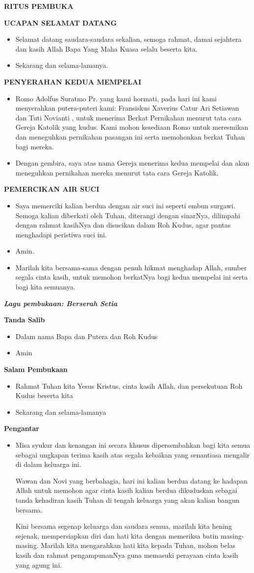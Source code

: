 \documentclass[10pt]{book}
\makeatletter
\newcommand{\judul}[1]{%
  {\parindent \z@ \centering \normalfont
    \interlinepenalty\@M \Large \bfseries #1\par\nobreak \vskip 20\p@ }}
\newcommand{\subjudul}[1]{%
  {\parindent \z@ \normalfont
    \interlinepenalty\@M \bfseries #1\par\nobreak \vskip 20\p@ }}
\newcommand{\lagu}[1]{%
  {\parindent \z@ \normalfont
    \interlinepenalty\@M \bfseries \emph{#1}\par\nobreak \vskip 20\p@ }}
\newcommand{\BU}[1]{\begin{itemize} \item[U:] #1 \end{itemize}}
\newcommand{\BI}[1]{\begin{itemize} \item[I:] #1 \end{itemize}}
\newcommand{\BO}[1]{\begin{itemize} \item[Orangtua:] #1 \end{itemize}}
\newcommand{\mempelaip}{Fransiskus Xaverius Catur Ari Setiawan }
\newcommand{\mempelaiw}{Tuti Novianti }
\newcommand{\romo}{Adolfus Suratmo Pr. }
\makeatother
\begin{document}
\thispagestyle{empty}
\Large
\judul{RITUS PEMBUKA}

\subjudul{UCAPAN SELAMAT DATANG}

\BI{Selamat datang saudara-saudara sekalian, semoga rahmat, damai sejahtera dan kasih Allah Bapa Yang Maha Kuasa selalu beserta kita.}

\BU{Sekarang dan selama-lamanya.}


\subjudul{PENYERAHAN KEDUA MEMPELAI}

\BO{Romo \romo yang kami hormati, pada hari ini kami menyerahkan putera-puteri kami: \mempelaip dan \mempelaiw , untuk  menerima Berkat Pernikahan menurut tata cara Gereja Katolik yang kudus. Kami mohon kesediaan Romo untuk meresmikan dan meneguhkan pernikahan pasangan ini serta memohonkan berkat Tuhan bagi mereka.}

\BI{Dengan gembira, saya atas nama Gereja menerima kedua mempelai dan akan meneguhkan pernikahan mereka menurut tata cara Gereja Katolik.}


\subjudul{PEMERCIKAN AIR SUCI} 

\BI{Saya memerciki kalian berdua dengan air suci ini seperti embun surgawi. Semoga kalian diberkati oleh Tuhan, diterangi dengan sinarNya, dilimpahi dengan rahmat kasihNya dan disucikan dalam Roh Kudus, agar pantas menghadapi peristiwa suci ini.} 

\BU{Amin.}

\BI{Marilah kita bersama-sama dengan penuh hikmat menghadap Allah, sumber segala cinta kasih, untuk memohon berkatNya bagi kedua mempelai ini serta bagi kita semuanya.}

\lagu{Lagu pembukaan: Berserah Setia}

\subjudul{Tanda Salib}
\BI{Dalam nama Bapa dan Putera dan Roh Kudus}
\BU{Amin}

\subjudul{Salam Pembukaan}
\BI{Rahmat Tuhan kita Yesus Kristus, cinta kasih Allah, dan persekutuan Roh Kudus beserta kita}
\BU{Sekarang dan selama-lamanya}

\subjudul{Pengantar}
\BI{Misa syukur dan kenangan ini secara khusus dipersembahkan bagi kita semua sebagai ungkapan terima kasih atas segala kebaikan yang senantiasa mengalir di dalam keluarga ini.

Wawan dan Novi yang berbahagia, hari ini kalian berdua datang ke hadapan Allah untuk memohon agar cinta kasih kalian berdua dikuduskan sebagai tanda kehadiran kasih Tuhan di tengah keluarga yang akan kalian bangun bersama.  

		Kini bersama segenap keluarga dan saudara semua, marilah kita hening sejenak, mempersiapkan diri dan hati kita dengan memeriksa batin masing-masing.  Marilah kita mengarahkan hati kita kepada Tuhan, mohon belas kasih dan rahmat pengampunanNya guna memasuki perayaan cinta kasih yang agung ini.}
\end{document}
